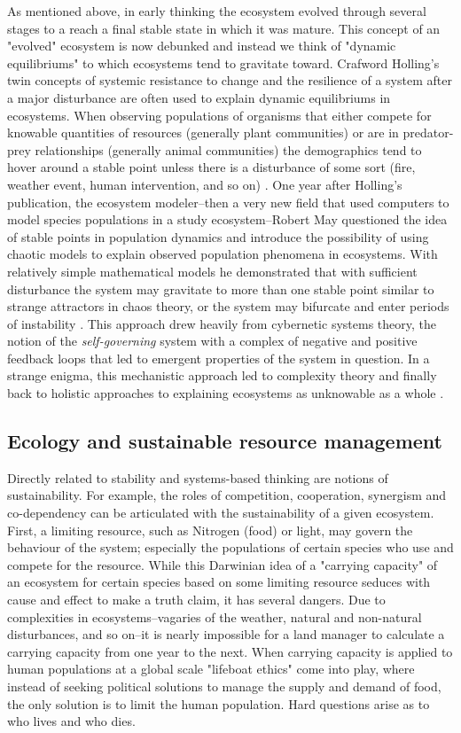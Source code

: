 As mentioned above, in early thinking the ecosystem evolved through several stages to a reach a final stable state in which it was mature. This concept of an "evolved" ecosystem is now debunked and instead we think of "dynamic equilibriums" to which ecosystems tend to gravitate toward. Crafword Holling's twin concepts of systemic resistance to change and the resilience of a system after a major disturbance are often used to explain dynamic equilibriums in ecosystems. When observing populations of organisms that either compete for knowable quantities of resources (generally plant communities) or are in predator-prey relationships (generally animal communities) the demographics tend to hover around a stable point unless there is a disturbance of some sort (fire, weather event, human intervention, and so on) \citep{holling_1973}. One year after Holling's publication, the ecosystem modeler--then a very new field that used computers to model species populations in a study ecosystem--Robert May questioned the idea of stable points in population dynamics and introduce the possibility of using chaotic models to explain observed population phenomena in ecosystems. With relatively simple mathematical models he demonstrated that with sufficient disturbance the system may gravitate to more than one stable point similar to strange attractors in chaos theory, or the system may bifurcate and enter periods of instability \citep{may_1974}. This approach drew heavily from cybernetic systems theory, the notion of the \textit{self-governing} system with a complex of negative and positive feedback loops that led to emergent properties of the system in question. In a strange enigma, this mechanistic approach led to complexity theory and finally back to holistic approaches to explaining ecosystems as unknowable as a whole \citep{barbour_1996}.

\subsection{Ecology and sustainable resource management}

Directly related to stability and systems-based thinking are notions of sustainability. For example, the roles of competition, cooperation, synergism and co-dependency can be articulated with the sustainability of a given ecosystem. First, a limiting resource, such as Nitrogen (food) or light, may govern the behaviour of the system; especially the populations of certain species who use and compete for the resource. While this Darwinian idea of a "carrying capacity" of an ecosystem for certain species based on some limiting resource seduces with cause and effect to make a truth claim, it has several dangers. Due to complexities in ecosystems--vagaries of the weather, natural and non-natural disturbances, and so on--it is nearly impossible for a land manager to calculate a carrying capacity from one year to the next. When carrying capacity is applied to human populations at a global scale "lifeboat ethics" come into play, where instead of seeking political solutions to manage the supply and demand of food, the only solution is to limit the human population. Hard questions arise as to who lives and who dies.

